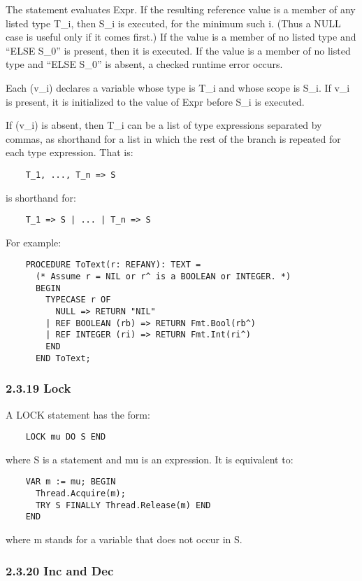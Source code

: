 \documentclass[10pt]{article}
\begin{document}
 The statement evaluates Expr. If the resulting reference value is a member of any listed type T\_i, then S\_i is executed, for the minimum such i. (Thus a NULL case is useful only if it comes first.) If the value is a member of no listed type and ``ELSE S\_0'' is present, then it is executed. If the value is a member of no listed type and ``ELSE S\_0'' is absent, a checked runtime error occurs. 


  Each (v\_i) declares a variable whose type is T\_i and whose scope is S\_i. If v\_i is present, it is initialized to the value of Expr before S\_i is executed. 


  If (v\_i) is absent, then T\_i can be a list of type expressions separated by commas, as shorthand for a list in which the rest of the branch is repeated for each type expression. That is: 
\begin{verbatim}
    T_1, ..., T_n => S
\end{verbatim}
 is shorthand for: 
\begin{verbatim}
    T_1 => S | ... | T_n => S
\end{verbatim}



  For example: 
\begin{verbatim}
    PROCEDURE ToText(r: REFANY): TEXT =
      (* Assume r = NIL or r^ is a BOOLEAN or INTEGER. *)
      BEGIN
        TYPECASE r OF
          NULL => RETURN "NIL"
        | REF BOOLEAN (rb) => RETURN Fmt.Bool(rb^)
        | REF INTEGER (ri) => RETURN Fmt.Int(ri^)
        END
      END ToText;
\end{verbatim}



 
\subsubsection*{2.3.19 Lock}


  A LOCK statement has the form: 
\begin{verbatim}
    LOCK mu DO S END
\end{verbatim}
 where S is a statement and mu is an expression. It is equivalent to: 
\begin{verbatim}
    VAR m := mu; BEGIN
      Thread.Acquire(m);
      TRY S FINALLY Thread.Release(m) END
    END
\end{verbatim}
 where m stands for a variable that does not occur in S. 


 
\subsubsection*{2.3.20 Inc and Dec}
\end{document}
